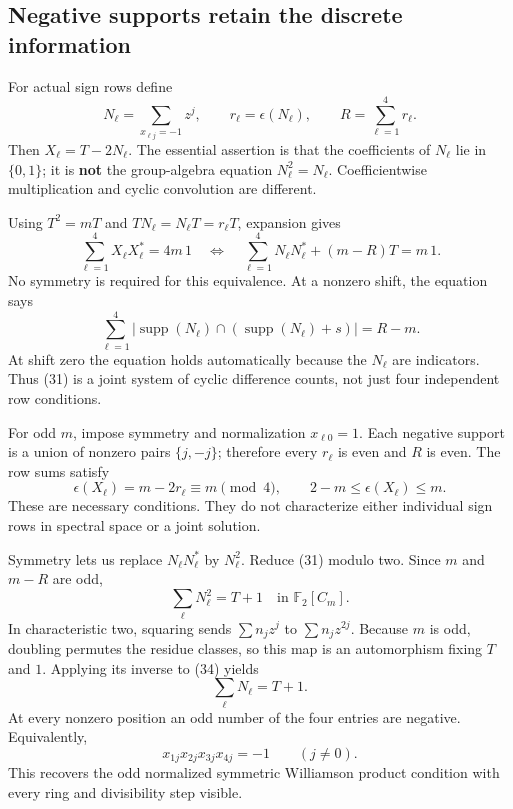 \documentclass[
  11pt,
]{article}
\begin{document}
\subsection{Negative supports retain the discrete
information}\label{negative-supports-retain-the-discrete-information}

For actual sign rows define \[
 N_\ell=\sum_{x_{\ell j}=-1}z^j,\qquad
 r_\ell=\epsilon(N_\ell),\qquad R=\sum_{\ell=1}^4r_\ell.
 \] Then \(X_\ell=T-2N_\ell\). The essential assertion is that the
coefficients of \(N_\ell\) lie in \(\{0,1\}\); it is \textbf{not} the
group-algebra equation \(N_\ell^2=N_\ell\). Coefficientwise
multiplication and cyclic convolution are different.

Using \(T^2=mT\) and \(TN_\ell=N_\ell T=r_\ell T\), expansion gives \[
 \sum_{\ell=1}^4X_\ell X_\ell^*=4m\,1
 \quad\Longleftrightarrow\quad
 \sum_{\ell=1}^4N_\ell N_\ell^*+(m-R)T=m\,1.              \tag{31}
\] No symmetry is required for this equivalence. At a nonzero shift, the
equation says \[
 \sum_{\ell=1}^4
    |\operatorname{supp}(N_\ell)\cap
          (\operatorname{supp}(N_\ell)+s)|=R-m.            \tag{32}
\] At shift zero the equation holds automatically because the \(N_\ell\)
are indicators. Thus (31) is a joint system of cyclic difference counts,
not just four independent row conditions.

For odd \(m\), impose symmetry and normalization \(x_{\ell0}=1\). Each
negative support is a union of nonzero pairs \(\{j,-j\}\); therefore
every \(r_\ell\) is even and \(R\) is even. The row sums satisfy \[
 \epsilon(X_\ell)=m-2r_\ell\equiv m\pmod4,\qquad
                  2-m\le\epsilon(X_\ell)\le m.            \tag{33}
\] These are necessary conditions. They do not characterize either
individual sign rows in spectral space or a joint solution.

Symmetry lets us replace \(N_\ell N_\ell^*\) by \(N_\ell^2\). Reduce
(31) modulo two. Since \(m\) and \(m-R\) are odd, \[
             \sum_\ell N_\ell^2=T+1
                 \quad\text{in }\mathbb F_2[C_m].         \tag{34}
\] In characteristic two, squaring sends \(\sum n_jz^j\) to
\(\sum n_jz^{2j}\). Because \(m\) is odd, doubling permutes the residue
classes, so this map is an automorphism fixing \(T\) and \(1\). Applying
its inverse to (34) yields \[
                        \sum_\ell N_\ell=T+1.            \tag{35}
\] At every nonzero position an odd number of the four entries are
negative. Equivalently, \[
                x_{1j}x_{2j}x_{3j}x_{4j}=-1
                         \qquad(j\ne0).                  \tag{36}
\] This recovers the odd normalized symmetric Williamson product
condition with every ring and divisibility step visible.
\end{document}
